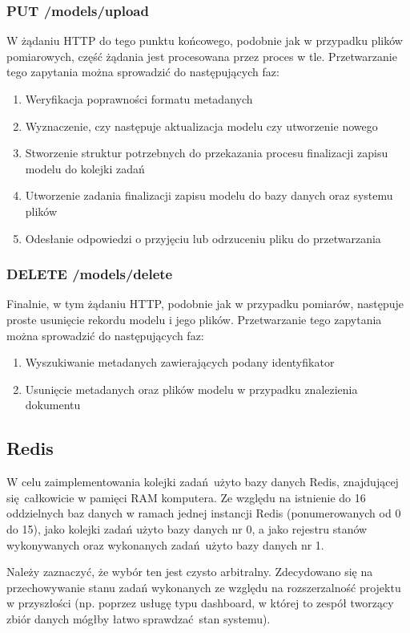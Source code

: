 	\subsubsection{PUT /models/upload}
	W żądaniu HTTP do tego punktu końcowego, podobnie jak w przypadku plików pomiarowych, część żądania jest procesowana przez proces w tle. Przetwarzanie tego zapytania można sprowadzić do następujących faz:
	\begin{enumerate}
		\item {Weryfikacja poprawności formatu metadanych}
		\item {Wyznaczenie, czy następuje aktualizacja modelu czy utworzenie nowego}
		\item {Stworzenie struktur potrzebnych do przekazania procesu finalizacji zapisu modelu do kolejki zadań}
		\item {Utworzenie zadania finalizacji zapisu modelu do bazy danych oraz systemu plików}
		\item {Odesłanie odpowiedzi o przyjęciu lub odrzuceniu pliku do przetwarzania}
	\end{enumerate}
	
	\subsubsection{DELETE /models/delete}
	Finalnie, w tym żądaniu HTTP, podobnie jak w przypadku pomiarów, następuje proste usunięcie rekordu modelu i jego plików. Przetwarzanie tego zapytania można sprowadzić do następujących faz:
	\begin{enumerate}
		\item {Wyszukiwanie metadanych zawierających podany identyfikator}
		\item {Usunięcie metadanych oraz plików modelu w przypadku znalezienia dokumentu}
	\end{enumerate}
	
	\subsection{Redis}
	W celu zaimplementowania kolejki zadań użyto bazy danych Redis, znajdującej się całkowicie w pamięci RAM komputera. Ze względu na istnienie do 16 oddzielnych baz danych w ramach jednej instancji Redis (ponumerowanych od 0 do 15), jako kolejki zadań użyto bazy danych nr 0, a jako rejestru stanów wykonywanych oraz wykonanych zadań użyto bazy danych nr 1.
	
	Należy zaznaczyć, że wybór ten jest czysto arbitralny. Zdecydowano się na przechowywanie stanu zadań wykonanych ze względu na rozszerzalność projektu w przyszłości (np. poprzez usługę typu dashboard, w której to zespół tworzący zbiór danych mógłby łatwo sprawdzać stan systemu).
	
